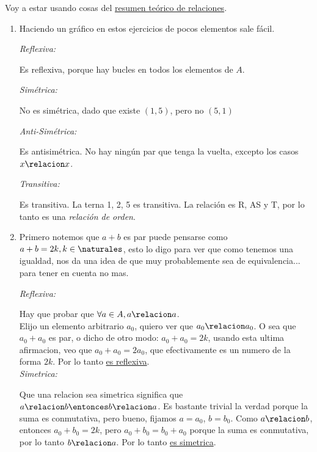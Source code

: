 Voy a estar usando cosas del \hyperlink{teoria-1:relaciones}{resumen teórico de relaciones}.

\begin{enumerate}[label=\roman*)]
  \item Haciendo un gráfico en estos ejercicios de pocos elementos sale fácil.

        \begin{minipage}{0.60\textwidth}
          \textit{Reflexiva:}

          Es reflexiva, porque hay bucles en todos los elementos de $A$.

          \textit{Simétrica:}

          No es simétrica, dado que existe $(1, 5)$, pero no $(5, 1)$

          \textit{Anti-Simétrica:}

          Es antisimétrica. No hay ningún par que tenga la vuelta, excepto los casos $x \relacion x$.

          \textit{Transitiva:}
          
          Es transitiva. La terna 1, 2, 5 es transitiva.
          La relación es R, AS y T, por lo tanto es una \textit{relación de orden}.
        \end{minipage}
        \begin{minipage}{0.3\textwidth}
          \quad  \veintidosi
        \end{minipage}

  \item Primero notemos que $a + b$ es par puede pensarse como $a + b = 2k, k \in \naturales$, esto lo digo
        para ver que como tenemos una igualdad, nos da una idea de que muy probablemente sea de equivalencia... para tener en cuenta no mas.

        \textit{Reflexiva:}

        Hay que probar que $\forall a \in A, a \relacion a$. \\
        Elijo un elemento arbitrario $a_0$, quiero ver que $a_0 \relacion a_0$. O sea que $a_0 + a_0$ es par, o
        dicho de otro modo: $a_0 + a_0 = 2k$, usando esta ultima afirmacion, veo que $a_0 + a_0 = 2a_0$, que efectivamente
        es un numero de la forma $2k$. Por lo tanto \underline{es reflexiva}. \\

        \textit{Simetrica: }

        Que una relacion sea simetrica significa que $a \relacion b \entonces b \relacion a$.
        Es bastante trivial la verdad porque la suma es conmutativa, pero bueno, fijamos $a = a_0$, $b = b_0$.
        Como $a \relacion b$, entonces $a_0 + b_0 = 2k$, pero $a_0 + b_0 = b_0 + a_0$ porque la suma es conmutativa,
        por lo tanto $b \relacion a$. Por lo tanto \underline{es simetrica}. \\


\end{enumerate}
